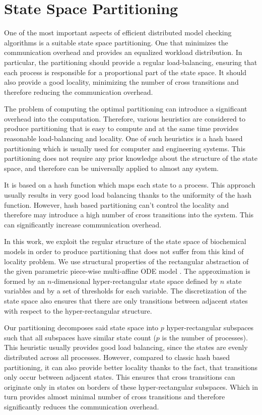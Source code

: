 \documentclass[12pt,oneside]{fithesis2}
\begin{document}
		\section{State Space Partitioning}
			\label{sec:partitioning}
			One of the most important aspects of efficient distributed model checking algorithms is a suitable state space partitioning. One that minimizes the communication overhead and provides an equalized workload distribution. In particular, the partitioning should provide a regular load-balancing, ensuring that each process is responsible for a proportional part of the state space. It should also provide a good locality, minimizing the number of cross transitions and therefore reducing the communication overhead.
			
			The problem of computing the optimal partitioning can introduce a significant overhead into the computation. Therefore, various heuristics are considered to produce partitioning that is easy to compute and at the same time provides reasonable load-balancing and locality. One of such heuristics is a hash based partitioning \cite{spin} which is usually used for computer and engineering systems. This partitioning does not require any prior knowledge about the structure of the state space, and therefore can be universally applied to almost any system.
			
			It is based on a hash function which maps each state to a process. This approach usually results in very good load balancing thanks to the uniformity of the hash function. However, hash based partitioning can't control the locality and therefore may introduce a high number of cross transitions into the system. This can significantly increase communication overhead.
			
			In this work, we exploit the regular structure of the state space of biochemical models in order to produce partitioning that does not suffer from this kind of locality problem. We use structural properties of the rectangular abstraction of the given parametric piece-wise multi-affine ODE model \cite{IFAC}. The approximation is formed by an $n$-dimensional hyper-rectangular state space defined by $n$ state variables and by a set of thresholds for each variable. The discretization of the state space also ensures that there are only transitions between adjacent states with respect to the hyper-rectangular structure.
			
			Our partitioning decomposes said state space into $p$ hyper-rectangular subspaces such that all subspaces have similar state count ($p$ is the number of processes). This heuristic usually provides good load balancing, since the states are evenly distributed across all processes. However, compared to classic hash based partitioning, it can also provide better locality thanks to the fact, that transitions only occur between adjacent states. This ensures that cross transitions can originate only in states on borders of these hyper-rectangular subspaces. Which in turn provides almost minimal number of cross transitions and therefore significantly reduces the communication overhead.
			
\end{document}
